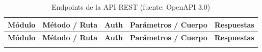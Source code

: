 {\scriptsize
\renewcommand{\arraystretch}{1.15}
\newcommand{\apiendpoint}[2]{\begingroup\Urlmuskip=0mu plus 2mu\relax\texttt{#1}\space\path{#2}\endgroup}
\begin{longtable}{|>{\raggedright\arraybackslash}p{1.25cm}|>{\raggedright\arraybackslash}p{3.55cm}|>{\centering\arraybackslash}p{0.75cm}|>{\raggedright\arraybackslash}p{4.0cm}|>{\raggedright\arraybackslash}p{1.8cm}|}
\caption{Endpoints de la API REST (fuente: OpenAPI 3.0)}\label{tab:api}\\
\hline
\textbf{Módulo} & \textbf{Método / Ruta} & \textbf{Auth} & \textbf{Parámetros / Cuerpo} & \textbf{Respuestas} \\
\hline
\endfirsthead
\hline
\textbf{Módulo} & \textbf{Método / Ruta} & \textbf{Auth} & \textbf{Parámetros / Cuerpo} & \textbf{Respuestas} \\
\hline
\endhead
\hline
\endlastfoot


\end{longtable}}
